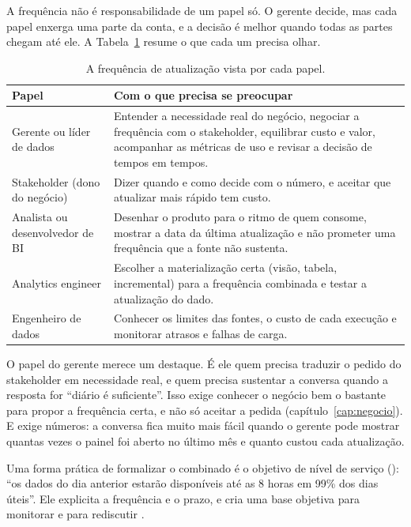 A frequência não é responsabilidade de um papel só. O gerente decide, mas cada papel enxerga
uma parte da conta, e a decisão é melhor quando todas as partes chegam até ele. A
Tabela~\ref{tab:papeis-frequencia} resume o que cada um precisa olhar.

\begin{table}[htbp]
  \centering
  \caption{A frequência de atualização vista por cada papel.}
  \label{tab:papeis-frequencia}
  \small
  \begin{tabularx}{\textwidth}{@{}>{\raggedright\arraybackslash}p{}
      >{\raggedright\arraybackslash}X@{}}
    \toprule
    Papel & Com o que precisa se preocupar \\
    \midrule
    Gerente ou líder de dados & Entender a necessidade real do negócio, negociar a
      frequência com o stakeholder, equilibrar custo e valor, acompanhar as métricas de
      uso e revisar a decisão de tempos em tempos. \\
    \addlinespace
    Stakeholder (dono do negócio) & Dizer quando e como decide com o número, e aceitar
      que atualizar mais rápido tem custo. \\
    \addlinespace
    Analista ou desenvolvedor de BI & Desenhar o produto para o ritmo de quem consome,
      mostrar a data da última atualização e não prometer uma frequência que a fonte não
      sustenta. \\
    \addlinespace
    Analytics engineer & Escolher a materialização certa (visão, tabela, incremental)
      para a frequência combinada e testar a atualização do dado. \\
    \addlinespace
    Engenheiro de dados & Conhecer os limites das fontes, o custo de cada execução e
      monitorar atrasos e falhas de carga. \\
    \bottomrule
  \end{tabularx}
\end{table}

O papel do gerente merece um destaque. É ele quem precisa traduzir o pedido do stakeholder em
necessidade real, e quem precisa sustentar a conversa quando a resposta for \enquote{diário é
suficiente}. Isso exige conhecer o negócio bem o bastante para propor a frequência certa, e não
só aceitar a pedida (capítulo~\ref{cap:negocio}). E exige números: a conversa fica muito mais
fácil quando o gerente pode mostrar quantas vezes o painel foi aberto no último mês e quanto
custou cada atualização.

Uma forma prática de formalizar o combinado é o objetivo de nível de serviço
(): \enquote{os dados do dia anterior estarão disponíveis até as 8
horas em 99\% dos dias úteis}. Ele explicita a frequência e o prazo, e cria uma base objetiva
para monitorar e para rediscutir \parencite{beyer2016}.

